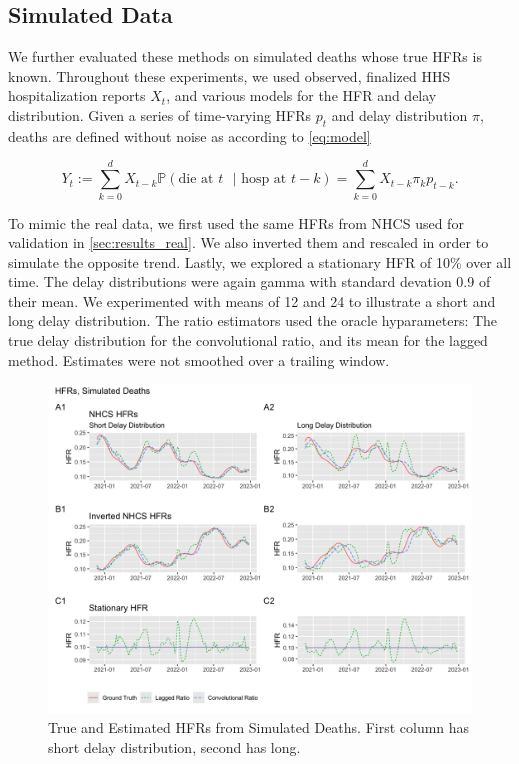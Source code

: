 \documentclass{article}
\begin{document}
\subsection{Simulated Data}


We further evaluated these methods on simulated deaths whose true HFRs is known. Throughout these experiments, we used observed, finalized HHS hospitalization reports $X_t$, and various models for the HFR and delay distribution. Given a series of time-varying HFRs $p_t$ and delay distribution $\pi$, deaths are defined without noise as according to \ref{eq:model}

$$Y_t := \sum_{k=0}^d X_{t-k} \mathbb{P}(\text{die at $t$ }\vert\text{ hosp at }t-k) = \sum_{k=0}^d X_{t-k} \pi_k p_{t-k}.$$

To mimic the real data, we first used the same HFRs from NHCS used for validation in \ref{sec:results_real}. We also inverted them and rescaled in order to simulate the opposite trend. Lastly, we explored a stationary HFR of 10\% over all time. The delay distributions were again gamma with standard devation 0.9 of their mean. We experimented with means of 12 and 24 to illustrate a short and long delay distribution. The ratio estimators used the oracle hyparameters: The true delay distribution for the convolutional ratio, and its mean for the lagged method. Estimates were not smoothed over a trailing window.

\begin{figure}
    \centering
    \includegraphics[width=0.9\linewidth]{Figs/simulated_results2.png}
    \caption{True and Estimated HFRs from Simulated Deaths. First column has short delay distribution, second has long.}
    \label{fig:sims}
\end{figure}
\end{document}
